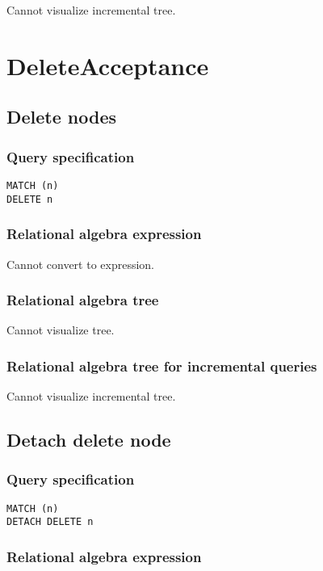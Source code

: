 Cannot visualize incremental tree.

\section{DeleteAcceptance}

\subsection{Delete nodes}

\subsubsection*{Query specification}

\begin{lstlisting}
MATCH (n)
DELETE n
\end{lstlisting}

\subsubsection*{Relational algebra expression}

Cannot convert to expression.

\subsubsection*{Relational algebra tree}

Cannot visualize tree.

\subsubsection*{Relational algebra tree for incremental queries}

Cannot visualize incremental tree.

\subsection{Detach delete node}

\subsubsection*{Query specification}

\begin{lstlisting}
MATCH (n)
DETACH DELETE n
\end{lstlisting}

\subsubsection*{Relational algebra expression}

